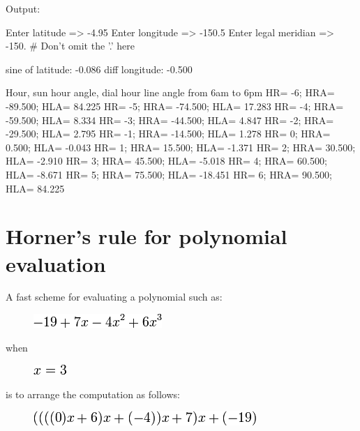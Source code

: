 \begin{itemize}
\begin{wideverbatim}
Output:

Enter latitude       => -4.95
Enter longitude      => -150.5
Enter legal meridian => -150.          # Don't omit the '.' here

    sine of latitude:   -0.086
    diff longitude:     -0.500

Hour, sun hour angle, dial hour line angle from 6am to 6pm
HR= -6; HRA= -89.500; HLA=  84.225
HR= -5; HRA= -74.500; HLA=  17.283
HR= -4; HRA= -59.500; HLA=   8.334
HR= -3; HRA= -44.500; HLA=   4.847
HR= -2; HRA= -29.500; HLA=   2.795
HR= -1; HRA= -14.500; HLA=   1.278
HR=  0; HRA=   0.500; HLA=  -0.043
HR=  1; HRA=  15.500; HLA=  -1.371
HR=  2; HRA=  30.500; HLA=  -2.910
HR=  3; HRA=  45.500; HLA=  -5.018
HR=  4; HRA=  60.500; HLA=  -8.671
HR=  5; HRA=  75.500; HLA= -18.451
HR=  6; HRA=  90.500; HLA=  84.225

\end{wideverbatim}

\pagebreak{}
\section*{Horner's rule for polynomial evaluation}

A fast scheme for evaluating a polynomial such as:

\begin{figure}[H]
\centering
\includegraphics[scale=.6]{graphics/9eb10505118ec312428f2a4fb8b05d1f.png}
\end{figure}

when

\begin{figure}[H]
\centering
\includegraphics[scale=.6]{graphics/2663fd4ac67a9a044457d845268cd7ce.png}
\end{figure}

is to arrange the computation as follows:

\begin{figure}[H]
\centering
\includegraphics[scale=.6]{graphics/f1267a46eea12e7c046cfc7fcb859cc2.png}
\end{figure}


\end{itemize}
